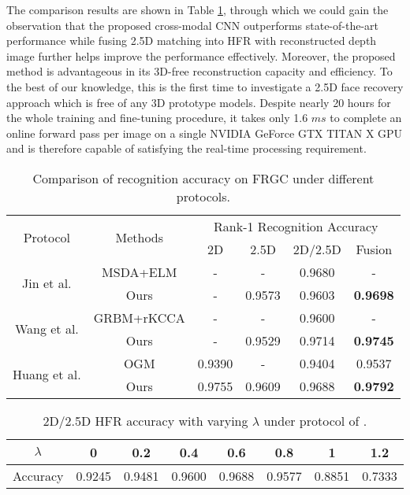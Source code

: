 \documentclass{bmvc2k}
\begin{document}
The comparison results are shown in Table \ref{recognition}, through which we could gain the observation that the proposed cross-modal CNN outperforms state-of-the-art performance while fusing 2.5D matching into HFR with reconstructed depth image further helps improve the performance effectively. Moreover, the proposed method is advantageous in its 3D-free reconstruction capacity and efficiency. To the best of our knowledge, this is the first time to investigate a 2.5D face recovery approach which is free of any 3D prototype models. Despite nearly 20 hours for the whole training and fine-tuning procedure, it takes only 1.6 $ms$ to complete an online forward pass per image on a single NVIDIA GeForce GTX TITAN X GPU and is therefore capable of satisfying the real-time processing requirement. 

\begin{table}
\begin{center}
\begin{tabular}{cccccc}
\hline
\multirow{2}{*}{Protocol} & \multirow{2}{*}{Methods} & \multicolumn{4}{c}{Rank-1 Recognition Accuracy} \\ \cline{3-6}
& & 2D & 2.5D & 2D/2.5D & Fusion \\
\hline
\multirow{2}{*}{Jin et al. \cite{jin2014cross}} & MSDA+ELM \cite{jin2014cross}                                        & -      & - & 0.9680 & - \\
                    & Ours & -      & 0.9573 & 0.9603      & \textbf{0.9698} \\      
\multirow{2}{*}{Wang et al. \cite{wang20142d}} & GRBM+rKCCA \cite{wang20142d}                                            & -      & - & 0.9600 & - \\
                    & Ours & -      & 0.9529 & 0.9714      & \textbf{0.9745} \\ 
\multirow{2}{*}{Huang et al. \cite{huang2012oriented}} & OGM \cite{huang2012oriented}                            & 0.9390 & - & 0.9404 & 0.9537 \\
                    & Ours & 0.9755      & 0.9609 & 0.9688      & \textbf{0.9792} \\ 
\hline
\end{tabular}
\end{center}
\caption{Comparison of recognition accuracy on FRGC under different protocols.}
\label{recognition}
\end{table}

\begin{table}
\begin{center}
\begin{tabular}{cccccccc}
\hline
$\lambda$ & 0 & 0.2 & 0.4 & 0.6 & 0.8 & 1 & 1.2 \\
\hline
Accuracy & 0.9245 & 0.9481 & 0.9600 & 0.9688 & 0.9577 & 0.8851 & 0.7333\\
\hline
\end{tabular}
\end{center}
\caption{2D/2.5D HFR accuracy with varying $\lambda$ under protocol of \cite{huang2012oriented}.}
\label{hyper}
\end{table}
\end{document}
